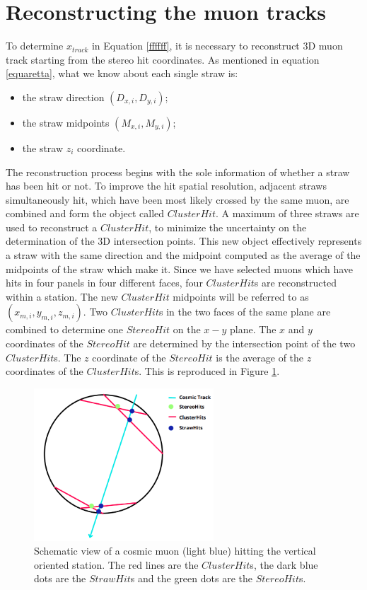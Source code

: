 \section{Reconstructing the muon tracks}\label{reconstruction}
To determine $x_{track}$ in Equation \ref{ffffff}, 
it is necessary to reconstruct 3D muon track 
starting from the stereo hit coordinates.
As mentioned in equation \ref{equaretta}, 
what we know about each single straw is:
\begin{itemize}
    \item the straw direction $(D_{x,i},D_{y,i})$;
    \item the straw midpoints $(M_{x,i},M_{y,i})$;
    \item the straw $z_i$ coordinate.
\end{itemize} 
The reconstruction process begins 
with the sole information of whether 
a straw has been hit or not.
To improve the hit spatial resolution, adjacent 
straws simultaneously hit, which have been most 
likely crossed by the same muon, are combined 
and form the object called $ClusterHit$. 
A maximum of three straws are used to reconstruct a 
$ClusterHit$, to minimize the uncertainty on 
the determination of the 3D intersection points.
This new object effectively represents a 
straw with the same direction and the midpoint 
computed as the average of the midpoints of the straw 
which make it. Since we have selected muons which 
have hits in four panels in four different 
faces, four $ClusterHit$s are reconstructed 
within a station. The new $ClusterHit$ 
midpoints will be referred to as 
$(x_{m,i}, y_{m,i}, z_{m,i})$.
Two $ClusterHit$s in the two faces of the same 
plane are combined to determine one $StereoHit$ on 
the $x-y$ plane. 
The $x$ and $y$ coordinates of the 
$StereoHit$ are determined by the 
intersection point of the two 
$ClusterHit$s. The $z$ coordinate of 
the $StereoHit$ is the average of the 
$z$ coordinates of the $ClusterHit$s.
This is reproduced in Figure \ref{fig:stco}.
\begin{figure}[!h]
    \centering
    \includegraphics[width =0.6\textwidth]{figures/png/Screenshot_20240810_210144.png}
    \caption[Schematic view of a cosmic muon hitting the vertical oriented station.]{Schematic view of a cosmic muon (light blue) hitting the vertical oriented station. The red lines are the $ClusterHit$s, the dark blue dots 
    are the $StrawHit$s and the green dots are the $StereoHit$s.}
    \label{fig:stco}
\end{figure}
